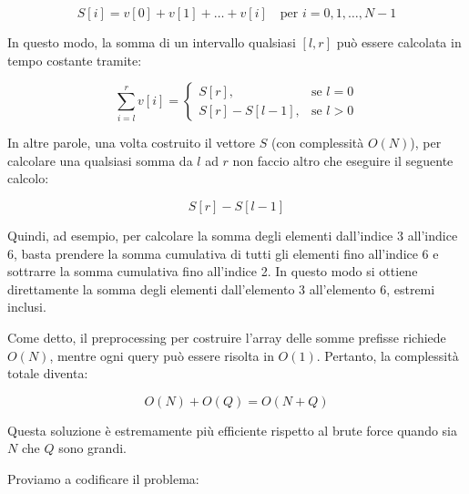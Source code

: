 \begin{equation*}
	S[i] = v[0] + v[1] + \dots + v[i] \quad \text{per } i = 0, 1, \dots, N-1
\end{equation*}

In questo modo, la somma di un intervallo qualsiasi $[l, r]$ può essere calcolata in tempo costante tramite:

\begin{equation*}
	\sum_{i=l}^{r} v[i] =
	\begin{cases}
		S[r], & \text{se } l = 0 \\
		S[r] - S[l-1], & \text{se } l > 0
	\end{cases}
\end{equation*}

In altre parole, una volta costruito il vettore $S$ (con complessità $O(N)$), per calcolare una qualsiasi somma da $l$ ad $r$ non faccio altro che eseguire il seguente calcolo:

\begin{equation}
	S[r] - S[l-1]
\end{equation}

Quindi, ad esempio, per calcolare la somma degli elementi dall'indice 3 all'indice 6, basta prendere la somma cumulativa di tutti gli elementi fino all'indice 6 e sottrarre la somma cumulativa fino all'indice 2. In questo modo si ottiene direttamente la somma degli elementi dall'elemento 3 all'elemento 6, estremi inclusi.

Come detto, il preprocessing per costruire l'array delle somme prefisse richiede $O(N)$, mentre ogni query può essere risolta in $O(1)$.  
Pertanto, la complessità totale diventa:

\begin{equation*}
	O(N) + O(Q) = O(N + Q)
\end{equation*}

Questa soluzione è estremamente più efficiente rispetto al brute force quando sia $N$ che $Q$ sono grandi.

Proviamo a codificare il problema:

